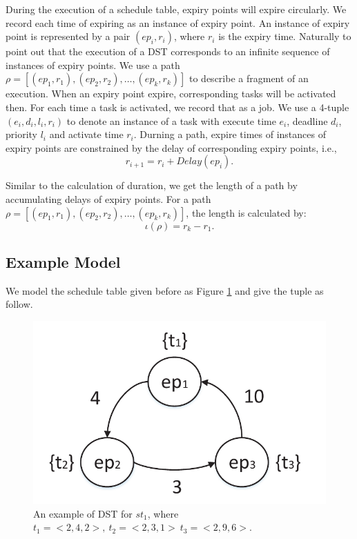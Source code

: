 \documentclass[10pt,conference]{IEEEtran}
\begin{document}
During the execution of a schedule table, expiry points will expire circularly. We record each time of expiring as an instance of expiry point. An instance of expiry point is represented by a pair $(ep_i,r_i)$, where $r_i$ is the expiry time. 
Naturally to point out that the execution of a DST corresponds to an infinite sequence of instances of expiry points. 
We use a path $\rho=[(ep_1,r_1),(ep_2,r_2),\dots,(ep_k,r_k)]$ to describe a fragment of an execution. When an expiry point expire, corresponding tasks will be activated then. For each time a task is activated, we record that as a job. We use a 4-tuple $(e_i,d_i,l_i,r_i)$ to denote an instance of a task with execute time $e_i$, deadline $d_i$, priority $l_i$ and activate time $r_i$. Durning a path, expire times of instances of expiry points are constrained by the delay of corresponding expiry points, i.e., 
\[r_{i+1}=r_i+Delay(ep_i).\]

Similar to the calculation of duration, we get the length of a path by accumulating delays of expiry points. For a path $\rho=[(ep_1,r_1),(ep_2,r_2),\dots,(ep_k,r_k)]$, the length is calculated by: \[\iota(\rho)=r_k-r_1.\]


\subsection{Example Model}\label{section_dst_1}
We model the schedule table given before as Figure \ref{figure_dst1} and give the tuple as follow.
\begin{figure}
  \centering
  \includegraphics[scale=.5]{graphics/figure_dst1-eps-converted-to.pdf}
  \caption{An example of DST for $st_1$, where $t_1=<2,4,2>,\ t_2=<2,3,1>\ t_3=<2,9,6>$.}
  \label{figure_dst1}
\end{figure}
\end{document}
